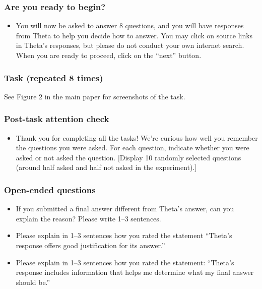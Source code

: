 \subsubsection*{Are you ready to begin?}
\begin{itemize}
    \item You will now be asked to answer 8 questions, and you will have responses from Theta to help you decide how to answer. You may click on source links in Theta’s responses, but please do not conduct your own internet search. When you are ready to proceed, click on the “next” button.
\end{itemize}


\subsubsection*{Task (repeated 8 times)}
See Figure 2 in the main paper for screenshots of the task.


\subsubsection*{Post-task attention check}
\begin{itemize}
    \item Thank you for completing all the tasks! We're curious how well you remember the questions you were asked. For each question, indicate whether you were asked or not asked the question. [Display 10 randomly selected questions (around half asked and half not asked in the experiment).]
\end{itemize}


\subsubsection*{Open-ended questions}
\begin{itemize}
    \item If you submitted a final answer different from Theta’s answer, can you explain the reason? Please write 1–3 sentences.
    \item Please explain in 1–3 sentences how you rated the statement ``Theta's response offers good justification for its answer.''
    \item Please explain in 1–3 sentences how you rated the statement: ``Theta’s response includes information that helps me determine what my final answer should be.''
\end{itemize}



